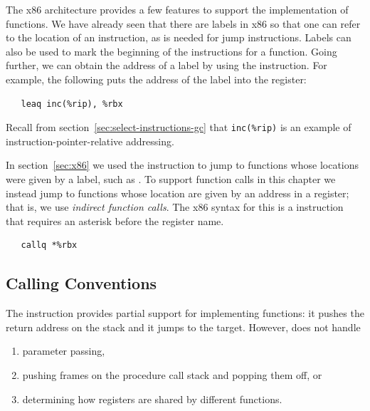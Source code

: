\documentclass[7x10]{TimesAPriori_MIT}%
\numberwithin{theorem}{chapter}
\numberwithin{definition}{chapter}
\numberwithin{equation}{chapter}
\begin{document}


The x86 architecture provides a few features to support the
implementation of functions. We have already seen that there are
labels in x86 so that one can refer to the location of an instruction,
as is needed for jump instructions. Labels can also be used to mark
the beginning of the instructions for a function.  Going further, we
can obtain the address of a label by using the 
instruction. For example, the following puts the address of the
 label into the  register:
\begin{lstlisting}
   leaq inc(%rip), %rbx
\end{lstlisting}
Recall from section~\ref{sec:select-instructions-gc} that
\verb!inc(%rip)! is an example of instruction-pointer-relative
addressing.

In section~\ref{sec:x86} we used the  instruction to jump
to functions whose locations were given by a label, such as
. To support function calls in this chapter we instead
jump to functions whose location are given by an address in
a register; that is, we use \emph{indirect function calls}. The
x86 syntax for this is a  instruction that requires an asterisk
before the register name.
\begin{lstlisting}
   callq *%rbx
\end{lstlisting}


\subsection{Calling Conventions}
\label{sec:calling-conventions-fun}


The  instruction provides partial support for implementing
functions: it pushes the return address on the stack and it jumps to
the target. However,  does not handle
\begin{enumerate}
\item parameter passing,
\item pushing frames on the procedure call stack and popping them off,
  or
\item determining how registers are shared by different functions.
\end{enumerate}
\end{document}
